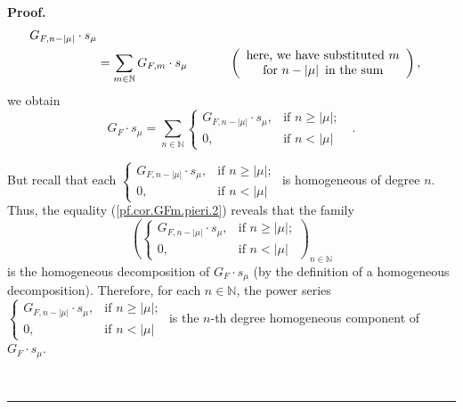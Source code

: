 \documentclass[numbers=enddot,12pt,final,onecolumn,notitlepage]{scrartcl}%
\theoremstyle{definition}
\newenvironment{proof}[1][Proof]{\noindent\textbf{#1.} }{\ \rule{0.5em}{0.5em}}
\let\sumnonlimits\sum
\renewcommand{\sum}{\sumnonlimits\limits}
\newenvironment{verlong}{}{}
\begin{document}
\begin{verlong}
\begin{proof}
\begin{align*}
{{}}G_{F,n-\left\vert \mu\right\vert }\cdot s_{\mu}\\
&  =\sum_{m\in\mathbb{N}}G_{F,m}\cdot s_{\mu}\ \ \ \ \ \ \ \ \ \ \left(
\begin{array}
[c]{c}%
\text{here, we have substituted }m\\
\text{for }n-\left\vert \mu\right\vert \text{ in the sum}%
\end{array}
\right)  ,
\end{align*}
we obtain%
\begin{equation}
G_{F}\cdot s_{\mu}=\sum_{n\in\mathbb{N}}%
\begin{cases}
G_{F,n-\left\vert \mu\right\vert }\cdot s_{\mu}, & \text{if }n\geq\left\vert
\mu\right\vert ;\\
0, & \text{if }n<\left\vert \mu\right\vert
\end{cases}
\ \ \ . \label{pf.cor.GFm.pieri.2}%
\end{equation}


But recall that each $%
\begin{cases}
G_{F,n-\left\vert \mu\right\vert }\cdot s_{\mu}, & \text{if }n\geq\left\vert
\mu\right\vert ;\\
0, & \text{if }n<\left\vert \mu\right\vert
\end{cases}
$ is homogeneous of degree $n$. Thus, the equality (\ref{pf.cor.GFm.pieri.2})
reveals that the family
\[
\left(
\begin{cases}
G_{F,n-\left\vert \mu\right\vert }\cdot s_{\mu}, & \text{if }n\geq\left\vert
\mu\right\vert ;\\
0, & \text{if }n<\left\vert \mu\right\vert
\end{cases}
\right)  _{n\in\mathbb{N}}%
\]
is the homogeneous decomposition of $G_{F}\cdot s_{\mu}$ (by the definition of
a homogeneous decomposition). Therefore, for each $n\in\mathbb{N}$, the power
series $%
\begin{cases}
G_{F,n-\left\vert \mu\right\vert }\cdot s_{\mu}, & \text{if }n\geq\left\vert
\mu\right\vert ;\\
0, & \text{if }n<\left\vert \mu\right\vert
\end{cases}
$ is the $n$-th degree homogeneous component of $G_{F}\cdot s_{\mu}$.


\end{proof}
\end{verlong}
\end{document}
